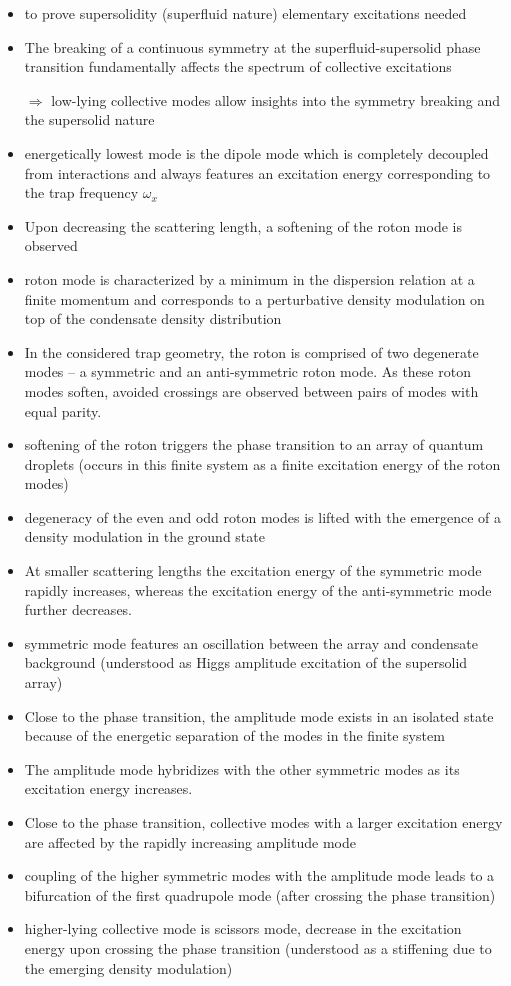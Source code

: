  
\begin{itemize}
    \item to prove supersolidity (superfluid nature) elementary excitations needed
    \item The breaking of a continuous symmetry at the superfluid-supersolid phase transition fundamentally
affects the spectrum of collective excitations
    \item[$\Rightarrow$] low-lying collective modes allow insights into the symmetry breaking and the supersolid nature
    \item energetically lowest mode is the dipole mode which is completely decoupled from interactions and always
        features an excitation energy corresponding to the trap frequency $\omega_{x}$
    \item Upon decreasing the scattering length, a softening of the roton
        mode is observed
    \item roton mode is characterized by a minimum in the dispersion relation at a finite momentum
        and corresponds to a perturbative density modulation on top of the condensate density distribution
    \item In the considered trap geometry, the roton is comprised of two degenerate
        modes – a symmetric and an anti-symmetric roton mode. As these roton modes soften,
        avoided crossings are observed between pairs of modes with equal parity.
    \item softening of the roton triggers the phase transition to an array of quantum
        droplets (occurs in this finite system as a finite excitation energy of the roton modes)
    \item degeneracy of the even and odd roton modes is lifted with the emergence of a density modulation
        in the ground state
    \item At smaller scattering lengths the excitation energy of the symmetric mode rapidly increases,
        whereas the excitation energy of the anti-symmetric mode further decreases.
    \item symmetric mode features an oscillation between the array and condensate background
        (understood as Higgs amplitude excitation of the supersolid array)
    \item Close to the phase transition, the amplitude mode exists in an isolated state because of the
        energetic separation of the modes in the finite system
    \item The amplitude mode hybridizes with the other symmetric modes as its excitation energy increases.
    \item Close to the phase transition, collective modes with a larger excitation energy are affected
        by the rapidly increasing amplitude mode
    \item coupling of the higher symmetric modes with the amplitude mode leads to a bifurcation of the
        first quadrupole mode (after crossing the phase transition)
    \item higher-lying collective mode is scissors mode, decrease in the excitation energy upon crossing
        the phase transition (understood as a stiffening due to the emerging density modulation)
\end{itemize}

